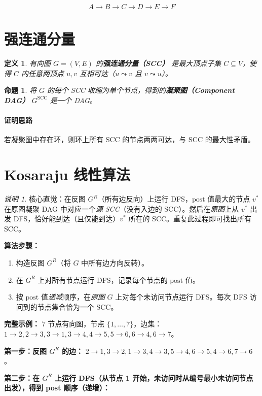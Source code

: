 \documentclass[UTF8,openany,12pt]{ctexbook}
\newtheorem{definition}{定义}[chapter]
\newtheorem{proposition}{命题}[chapter]
\theoremstyle{remark}
\newtheorem{remark}{说明}[chapter]
\newcommand{\proofidea}[1]{\paragraph{证明思路}#1}
\begin{document}
\[
  A \to B \to C \to D \to E \to F
\]

\section{强连通分量}

\begin{definition}
有向图 $G=(V,E)$ 的\textbf{强连通分量（SCC）} 是最大顶点子集 $C \subseteq V$，使得 $C$ 内任意两顶点 $u,v$ 互相可达（$u \leadsto v$ 且 $v \leadsto u$）。
\end{definition}

\begin{proposition}
将 $G$ 的每个 SCC 收缩为单个节点，得到的\textbf{凝聚图（Component DAG）} $G^{\mathrm{SCC}}$ 是一个 DAG。
\end{proposition}

\proofidea{若凝聚图中存在环，则环上所有 SCC 的节点两两可达，与 SCC 的最大性矛盾。}

\section{Kosaraju 线性算法}

\begin{remark}
核心直觉：在反图 $G^R$（所有边反向）上运行 DFS，$\mathrm{post}$ 值最大的节点 $v^*$ 在原图凝聚 DAG 中对应一个\emph{源 SCC}（没有入边的 SCC）。然后在\emph{原图}上从 $v^*$ 出发 DFS，恰好能到达（且仅能到达）$v^*$ 所在的 SCC。重复此过程即可找出所有 SCC。
\end{remark}

\textbf{算法步骤：}
\begin{enumerate}
  \item 构造反图 $G^R$（将 $G$ 中所有边方向反转）。
  \item 在 $G^R$ 上对所有节点运行 DFS，记录每个节点的 $\mathrm{post}$ 值。
  \item 按 $\mathrm{post}$ 值\emph{递减}顺序，在\emph{原图} $G$ 上对每个未访问节点运行 DFS。每次 DFS 访问到的节点集合恰为一个 SCC。
\end{enumerate}

\textbf{完整示例：} 7 节点有向图，节点 $\{1,\ldots,7\}$，边集：$1\to2, 2\to3, 3\to1, 3\to4, 4\to5, 5\to6, 6\to4, 6\to7$。

\textbf{第一步：反图 $G^R$ 的边：} $2\to1, 3\to2, 1\to3, 4\to3, 5\to4, 6\to5, 4\to6, 7\to6$。

\textbf{第二步：在 $G^R$ 上运行 DFS（从节点 1 开始，未访问时从编号最小未访问节点出发），得到 post 顺序（递增）：}
\end{document}
